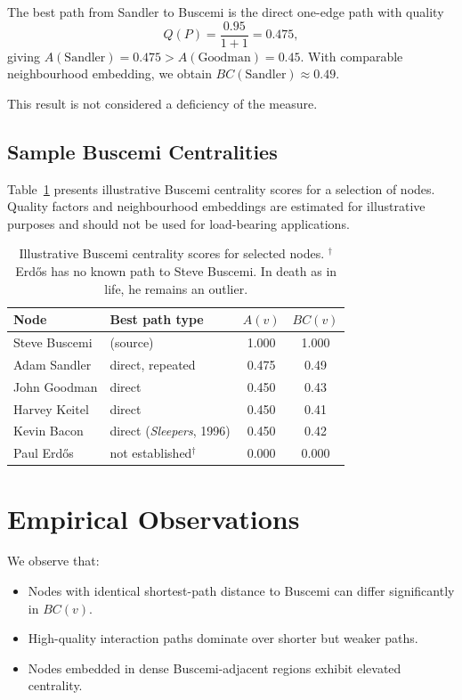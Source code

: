 \documentclass[11pt]{article}
\begin{document}
The best path from Sandler to Buscemi is the direct one-edge path with quality
\[
Q(P)=\frac{0.95}{1+1}=0.475,
\]
giving $A(\text{Sandler}) = 0.475 > A(\text{Goodman}) = 0.45$. With comparable neighbourhood embedding, we obtain $BC(\text{Sandler}) \approx 0.49$.

This result is not considered a deficiency of the measure.

\subsection{Sample Buscemi Centralities}

Table~\ref{tab:bc} presents illustrative Buscemi centrality scores for a selection of nodes. Quality factors and neighbourhood embeddings are estimated for illustrative purposes and should not be used for load-bearing applications.

\begin{table}[h]
\centering
\begin{tabular}{llcc}
\toprule
Node & Best path type & $A(v)$ & $BC(v)$ \\
\midrule
Steve Buscemi       & (source)                        & 1.000 & 1.000 \\
Adam Sandler        & direct, repeated                & 0.475 & 0.49  \\
John Goodman        & direct                          & 0.450 & 0.43  \\
Harvey Keitel       & direct                          & 0.450 & 0.41  \\
Kevin Bacon         & direct (\emph{Sleepers}, 1996)  & 0.450 & 0.42  \\
Paul Erd\H{o}s      & not established$^\dagger$       & 0.000 & 0.000 \\
\bottomrule
\end{tabular}
\caption{Illustrative Buscemi centrality scores for selected nodes. $^\dagger$Erd\H{o}s has no known path to Steve Buscemi. In death as in life, he remains an outlier.}
\label{tab:bc}
\end{table}

\section{Empirical Observations}

We observe that:
\begin{itemize}
\item Nodes with identical shortest-path distance to Buscemi can differ significantly in $BC(v)$.
\item High-quality interaction paths dominate over shorter but weaker paths.
\item Nodes embedded in dense Buscemi-adjacent regions exhibit elevated centrality.
\end{itemize}
\end{document}
